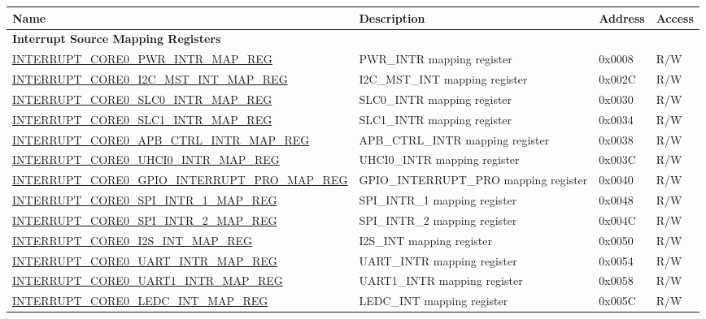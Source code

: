 \begin{longtable}{ | p{10cm} | m{9cm} | m{1.3cm} | m{1.0cm} | }
\hline\rowcolor{lightgray}
Name & Description & Address & Access \\ \hline
\endhead
\multicolumn{4}{|l|}{\textbf{Interrupt Source Mapping Registers}} \\ \hline
\hyperref[regdesc:INTERRUPTCORE0PWRINTRMAPREG]{INTERRUPT\_CORE0\_PWR\_INTR\_MAP\_REG} & PWR\_INTR mapping register & 0x0008 & R/W \\ \hline
\hyperref[regdesc:INTERRUPTCORE0I2CMSTINTMAPREG]{INTERRUPT\_CORE0\_I2C\_MST\_INT\_MAP\_REG} & I2C\_MST\_INT mapping register & 0x002C & R/W \\ \hline
\hyperref[regdesc:INTERRUPTCORE0SLC0INTRMAPREG]{INTERRUPT\_CORE0\_SLC0\_INTR\_MAP\_REG} & SLC0\_INTR mapping register & 0x0030 & R/W \\ \hline
\hyperref[regdesc:INTERRUPTCORE0SLC1INTRMAPREG]{INTERRUPT\_CORE0\_SLC1\_INTR\_MAP\_REG} & SLC1\_INTR mapping register & 0x0034 & R/W \\ \hline
\hyperref[regdesc:INTERRUPTCORE0APBCTRLINTRMAPREG]{INTERRUPT\_CORE0\_APB\_CTRL\_INTR\_MAP\_REG} & APB\_CTRL\_INTR mapping register & 0x0038 & R/W \\ \hline
\hyperref[regdesc:INTERRUPTCORE0UHCI0INTRMAPREG]{INTERRUPT\_CORE0\_UHCI0\_INTR\_MAP\_REG} & UHCI0\_INTR mapping register & 0x003C & R/W \\ \hline
\hyperref[regdesc:INTERRUPTCORE0GPIOINTERRUPTPROMAPREG]{INTERRUPT\_CORE0\_GPIO\_INTERRUPT\_PRO\_MAP\_REG} & GPIO\_INTERRUPT\_PRO mapping register & 0x0040 & R/W \\ \hline
\hyperref[regdesc:INTERRUPTCORE0SPIINTR1MAPREG]{INTERRUPT\_CORE0\_SPI\_INTR\_1\_MAP\_REG} & SPI\_INTR\_1 mapping register & 0x0048 & R/W \\ \hline
\hyperref[regdesc:INTERRUPTCORE0SPIINTR2MAPREG]{INTERRUPT\_CORE0\_SPI\_INTR\_2\_MAP\_REG} & SPI\_INTR\_2 mapping register & 0x004C & R/W \\ \hline
\hyperref[regdesc:INTERRUPTCORE0I2S1INTMAPREG]{INTERRUPT\_CORE0\_I2S\_INT\_MAP\_REG} & I2S\_INT mapping register & 0x0050 & R/W \\ \hline
\hyperref[regdesc:INTERRUPTCORE0UARTINTRMAPREG]{INTERRUPT\_CORE0\_UART\_INTR\_MAP\_REG} & UART\_INTR mapping register & 0x0054 & R/W \\ \hline
\hyperref[regdesc:INTERRUPTCORE0UART1INTRMAPREG]{INTERRUPT\_CORE0\_UART1\_INTR\_MAP\_REG} & UART1\_INTR mapping register & 0x0058 & R/W \\ \hline
\hyperref[regdesc:INTERRUPTCORE0LEDCINTMAPREG]{INTERRUPT\_CORE0\_LEDC\_INT\_MAP\_REG} & LEDC\_INT mapping register & 0x005C & R/W \\ \hline

\end{longtable}
